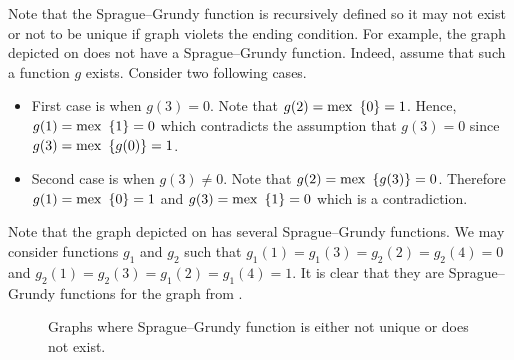 Note that the Sprague--Grundy function is recursively defined so it may
not exist or not to be unique if graph violets the ending condition.
For example, the graph depicted on 
does not have a Sprague--Grundy function.
Indeed, assume that such a function $g$ exists. Consider two following cases.
\begin{itemize}
    \item First case is when $g(3) = 0$. Note that $g(2) = \mex \set{0} = 1$.
        Hence, $g(1) = \mex \set{1} = 0$ which contradicts the assumption
        that $g(3) = 0$ since $g(3) = \mex \set{g(0)} = 1$.
    \item Second case is when $g(3) \neq 0$. Note that $g(2) = \mex \set{g(3)} = 0$.
        Therefore $g(1) = \mex \set{0} = 1$ and $g(3) = \mex \set{1} = 0$ which
        is a contradiction.
\end{itemize}

Note that the graph depicted on  has
several Sprague--Grundy functions. We may consider functions $g_1$ and $g_2$
such that $g_1(1) = g_1(3) = g_2(2) = g_2(4) = 0$ and
$g_2(1) = g_2(3) = g_1(2) = g_1(4) = 1$. It is clear that they are
Sprague--Grundy functions for the graph from
.

\begin{figure}
    \centering
    \qquad
    \caption{Graphs where Sprague--Grundy function is either not unique or does
      not exist.}
    \vskip 10pt
\end{figure}

